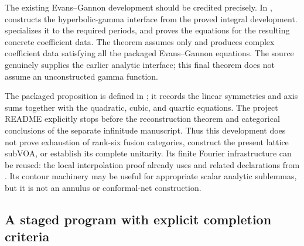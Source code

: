 The existing Evans--Gannon development should be credited precisely.
In ,
 constructs the
hyperbolic-gamma interface from the proved integral development.
 specializes it to the
required periods, and 
proves the equations for the resulting concrete coefficient data.
The theorem  assumes only
 and produces complex coefficient data satisfying all
the packaged Evans--Gannon equations. The source genuinely supplies
the earlier analytic interface; this final theorem does not assume
an unconstructed gamma function.

The packaged proposition 
is defined in ; it records
the linear symmetries and axis sums together with the quadratic,
cubic, and quartic equations. The project README explicitly stops
before the reconstruction theorem and categorical conclusions of
the separate infinitude manuscript. Thus this development does not
prove exhaustion of rank-six fusion categories, construct the
present lattice subVOA, or establish its complete unitarity. Its
finite Fourier infrastructure can be reused: the local interpolation
proof already uses  and related declarations from
. Its contour machinery
may be useful for appropriate scalar analytic sublemmas, but it is
not an annulus or conformal-net construction.

\subsection{A staged program with explicit completion criteria}

